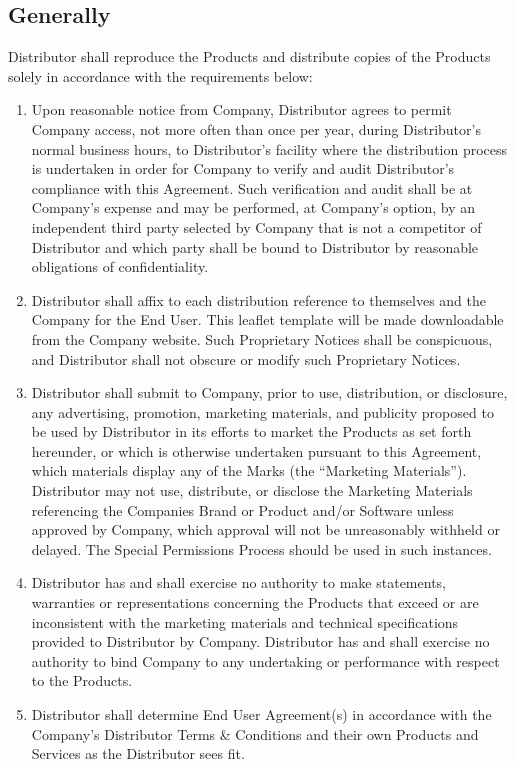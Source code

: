 \documentclass[letterpaper,10pt,openany,oneside,english]{sphinxmanual}
\begin{document}
\subsection{Generally}
\label{\detokenize{distributionandpackaging:generally}}
Distributor shall reproduce the Products and distribute copies of the Products solely in accordance with the requirements below:
\begin{enumerate}
\item {} 
Upon reasonable notice from Company, Distributor agrees to permit Company access, not more often than once per year, during Distributor’s normal business hours, to Distributor’s facility where the distribution process is undertaken in order for Company to verify and audit Distributor’s compliance with this Agreement. Such verification and audit shall be at Company’s expense and may be performed, at Company’s option, by an independent third party selected by Company that is not a competitor of Distributor and which party shall be bound to Distributor by reasonable obligations of confidentiality.

\item {} 
Distributor shall affix to each distribution reference to themselves and the Company for the End User. This leaflet template will be made downloadable from the Company website. Such Proprietary Notices shall be conspicuous, and Distributor shall not obscure or modify such Proprietary Notices.

\item {} 
Distributor shall submit to Company, prior to use, distribution, or disclosure, any advertising, promotion, marketing materials, and publicity proposed to be used by Distributor in its efforts to market the Products as set forth hereunder, or which is otherwise undertaken pursuant to this Agreement, which materials display any of the Marks (the “Marketing Materials”). Distributor may not use, distribute, or disclose the Marketing Materials referencing the Companies Brand or Product and/or Software unless approved by Company, which approval will not be unreasonably withheld or delayed. The Special Permissions Process should be used in such instances.

\item {} 
Distributor has and shall exercise no authority to make statements, warranties or representations concerning the Products that exceed or are inconsistent with the marketing materials and technical specifications provided to Distributor by Company.  Distributor has and shall exercise no authority to bind Company to any undertaking or performance with respect to the Products.

\item {} 
Distributor shall determine End User Agreement(s) in accordance with the Company’s Distributor Terms \& Conditions and their own Products and Services as the Distributor sees fit.

\end{enumerate}
\end{document}
